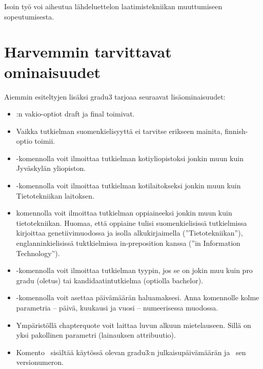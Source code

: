 \documentclass[utf8]{gradu3}
\begin{document}
Isoin työ voi aiheutua lähdeluettelon laatimistekniikan muuttumiseen
sopeutumisesta.

\section{Harvemmin tarvittavat ominaisuudet}

Aiemmin esiteltyjen lisäksi gradu3 tarjoaa seuraavat lisäominaisuudet:
\begin{itemize}
\item \LaTeXe:n vakio-optiot draft ja final toimivat.
\item Vaikka tutkielman suomenkielisyyttä ei tarvitse erikseen
  mainita, finnish-optio toimii.
\item \string\university-komennolla voit ilmoittaa tutkielman
  kotiyliopistoksi jonkin muun kuin Jyväskylän yliopiston.
\item  \string\department-komennolla voit ilmoittaa tutkielman
  kotilaitokseksi jonkin muun kuin Tietotekniikan laitoksen.
\item \string\subject-komennolla voit ilmoittaa tutkielman
  oppiaineeksi jonkin muun kuin tietotekniikan.  Huomaa, että oppiaine
  tulisi suomenkielisissä tutkielmissa kirjoittaa genetiivimuodossa ja
  isolla alkukirjaimella (''Tietotekniikan''), englanninkielisissä
  tuktkielmissa in-preposition kanssa (''in Information Technology'').
\item \string\type-komennolla voit ilmoittaa tutkielman tyypin, jos se
  on jokin muu kuin pro gradu (oletus) tai kandidaatintutkielma
  (optiolla bachelor).
\item \string\setdate-komennolla voit asettaa päivämäärän
  haluamaksesi.  Anna komennolle kolme parametria -- päivä,
  kuukausi ja vuosi -- numeerisessa muodossa.
\item Ympäristöllä chapterquote voit laittaa luvun alkuun
  mietelauseen.  Sillä on yksi pakollinen parametri (lainauksen
  attribuutio).
\item Komento \string\graduclsdate\ sisältää käytössä olevan gradu3:n
  julkaisupäivämäärän ja \string\graduclsversion\ sen versionumeron.
\end{itemize}
\end{document}
